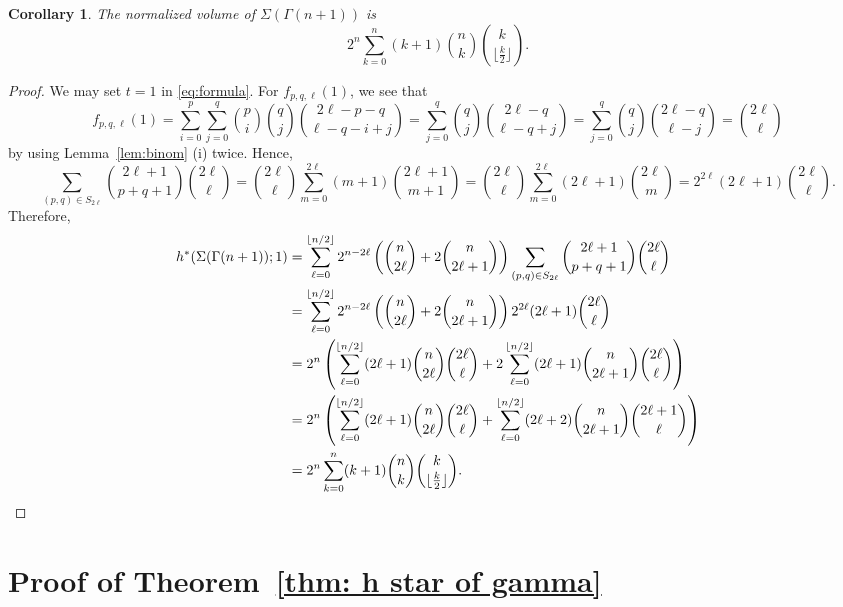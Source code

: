 \documentclass{amsart}
\numberwithin{equation}{section}
\theoremstyle{plain}
\newtheorem{cor}[thm]{Corollary}
\theoremstyle{definition}
\newcommand{\akihiro}[1]{\par \noindent
  \framebox{\begin{minipage}[c]{0.95 \textwidth}\color{blue} AKIHIRO'S NOTE:
      #1 \color{black}\end{minipage}}\par}
\begin{document}
\begin{cor}\label{cor: normalized volume}
    The normalized volume of $\Sigma(\Gamma(n+1))$ is
    \[
        2^n \sum_{k=0}^n (k+1)\binom{n}{k}\binom{k}{\lfloor\frac{k}{2}\rfloor}.
    \]
\end{cor}
\begin{proof}
    We may set $t=1$ in \eqref{eq:formula}.
    For $f_{p,q,\ell}(1)$, we see that 
    \[f_{p,q,\ell}(1)=\sum_{i=0}^p\sum_{j=0}^q\binom{p}{i}\binom{q}{j}\binom{2\ell-p-q}{\ell-q-i+j} 
    =\sum_{j=0}^q\binom{q}{j}\binom{2\ell-q}{\ell-q+j}=\sum_{j=0}^q\binom{q}{j}\binom{2\ell-q}{\ell-j}=\binom{2\ell}{\ell}\]
    by using Lemma~\ref{lem:binom} (i) twice.
    Hence, 
    \[\sum_{(p,q) \in S_{2\ell}}\binom{2\ell+1}{p+q+1}\binom{2\ell}{\ell}=\binom{2\ell}{\ell}\sum_{m=0}^{2\ell}(m+1)\binom{2\ell+1}{m+1}=\binom{2\ell}{\ell}\sum_{m=0}^{2\ell}(2\ell+1)\binom{2\ell}{m}=2^{2\ell}(2\ell+1)\binom{2\ell}{\ell}.\]
    Therefore, 
    \begin{align*}
    h^*(\Sigma(\Gamma(n+1)); 1)&=\sum_{\ell=0}^{\lfloor n/2 \rfloor}2^{n-2\ell}\left( \binom{n}{2\ell} + 2\binom{n}{2\ell+1} \right) \sum_{(p,q) \in S_{2\ell}}\binom{2\ell+1}{p+q+1}\binom{2\ell}{\ell} \\
    &=\sum_{\ell=0}^{\lfloor n/2 \rfloor}2^{n-2\ell}\left( \binom{n}{2\ell} + 2\binom{n}{2\ell+1} \right) 2^{2\ell}(2\ell+1)\binom{2\ell}{\ell} \\
    &=2^n \left(\sum_{\ell=0}^{\lfloor n/2 \rfloor}(2\ell+1)\binom{n}{2\ell}\binom{2\ell}{\ell} + 2\sum_{\ell=0}^{\lfloor n/2 \rfloor}(2\ell+1)\binom{n}{2\ell+1}\binom{2\ell}{\ell} \right) \\
    &=2^n \left(\sum_{\ell=0}^{\lfloor n/2 \rfloor}(2\ell+1)\binom{n}{2\ell}\binom{2\ell}{\ell} + \sum_{\ell=0}^{\lfloor n/2 \rfloor}(2\ell+2)\binom{n}{2\ell+1}\binom{2\ell+1}{\ell} \right) \\
    &=2^n \sum_{k=0}^n (k+1)\binom{n}{k}\binom{k}{\lfloor\frac{k}{2}\rfloor}. \qedhere
    \end{align*}
\end{proof}



\section{Proof of Theorem~\ref{thm: h star of gamma}}\label{sec: proof}
\end{document}
